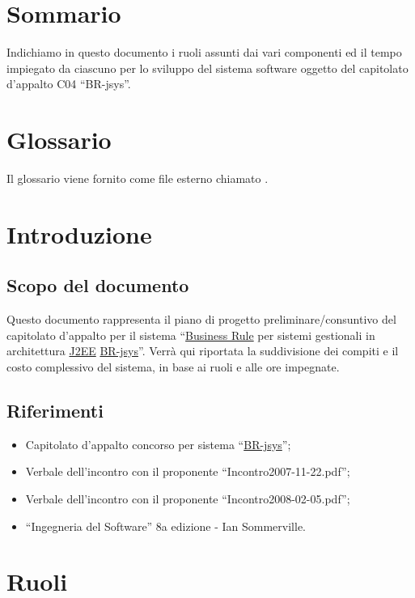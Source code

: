 \tableofcontents 
\chapter*{Sommario}
Indichiamo in questo documento i ruoli assunti dai vari componenti ed il tempo impiegato da ciascuno per lo sviluppo del sistema software oggetto del capitolato d'appalto C04 ``BR-jsys''.

\chapter*{Glossario}
Il glossario viene fornito come file esterno chiamato \Glossario .

\chapter{Introduzione}
\section{Scopo del documento}
Questo documento rappresenta il piano di progetto preliminare/consuntivo del capitolato d'appalto per il sistema ``\underline{Business Rule} per sistemi gestionali in architettura \underline{J2EE} \underline{BR-jsys}''. Verr\`a qui riportata la suddivisione dei compiti e il costo complessivo del sistema, in base ai ruoli e alle ore impegnate.

\section{Riferimenti}
\begin{itemize}
\item Capitolato d'appalto concorso per sistema ``\underline{BR-jsys}'';
\item Verbale dell'incontro con il proponente ``Incontro2007-11-22.pdf'';
\item Verbale dell'incontro con il proponente ``Incontro2008-02-05.pdf'';
\item ``Ingegneria del Software'' 8a edizione - Ian Sommerville.
\end{itemize}

\chapter{Ruoli}
